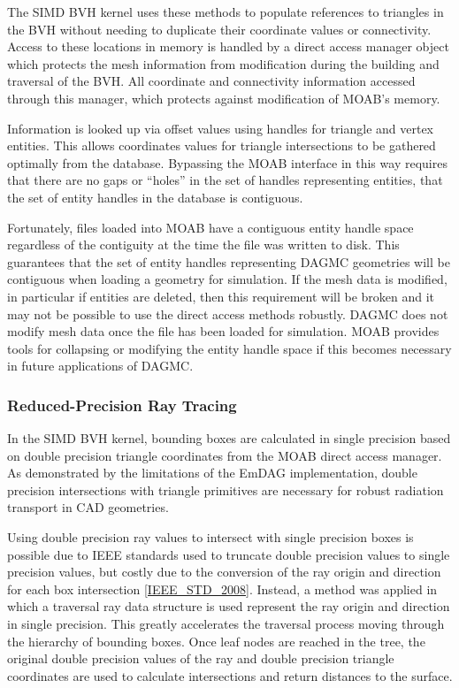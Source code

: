 The SIMD BVH kernel uses these methods to populate references to triangles in
the BVH without needing to duplicate their coordinate values or
connectivity. Access to these locations in memory is handled by a direct access
manager object which protects the mesh information from modification during the
building and traversal of the BVH. All coordinate and connectivity information
accessed through this manager, which protects against modification of MOAB's
memory.

Information is looked up via offset values using handles for triangle and vertex
entities. This allows coordinates values for triangle intersections to be
gathered optimally from the database. Bypassing the MOAB interface in this way
requires that there are no gaps or ``holes'' in the set of handles representing
entities, that the set of entity handles in the database is contiguous.

Fortunately, files loaded into MOAB have a contiguous entity handle space
regardless of the contiguity at the time the file was written to disk. This
guarantees that the set of entity handles representing DAGMC geometries will be
contiguous when loading a geometry for simulation. If the mesh data is modified,
in particular if entities are deleted, then this requirement will be broken and
it may not be possible to use the direct access methods robustly. DAGMC does not
modify mesh data once the file has been loaded for simulation. MOAB provides
tools for collapsing or modifying the entity handle space if this becomes
necessary in future applications of DAGMC.

\subsubsection{Reduced-Precision Ray Tracing}

In the SIMD BVH kernel, bounding boxes are calculated in single precision based
on double precision triangle coordinates from the MOAB direct access manager. As
demonstrated by the limitations of the EmDAG implementation, double precision
intersections with triangle primitives are necessary for robust radiation
transport in CAD geometries.

Using double precision ray values to intersect with single precision boxes is
possible due to IEEE standards used to truncate double precision values to single
precision values, but costly due to the conversion of the ray origin and
direction for each box intersection \ref{IEEE_STD_2008}. Instead, a method was
applied in which a traversal ray data structure is used represent the ray origin
and direction in single precision. This greatly accelerates the traversal
process moving through the hierarchy of bounding boxes. Once leaf nodes are
reached in the tree, the original double precision values of the ray and double
precision triangle coordinates are used to calculate intersections and return
distances to the surface.

